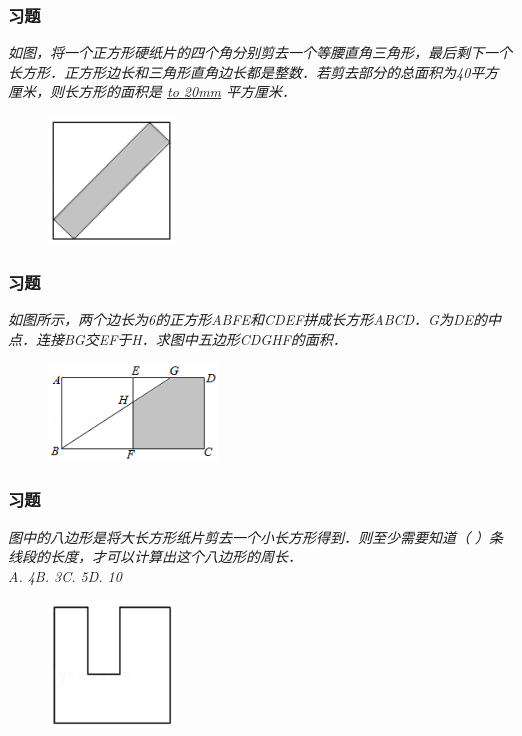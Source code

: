 \begin{frame}
    \frametitle{习题\theframecounter}
    \textit{如图，将一个正方形硬纸片的四个角分别剪去一个等腰直角三角形，最后剩下一个长方形．正方形边长和三角形直角边长都是整数．若剪去部分的总面积为40平方厘米，则长方形的面积是 \underline{\hbox to 20mm{}} 平方厘米．} 
    \begin{figure}[H] 
        \centering
        \includegraphics[width=0.3\textwidth]{./pics/Chapter_3/12.png}
    \end{figure}
\end{frame}

\begin{frame}
    \frametitle{习题\theframecounter}
    \vspace*{-1cm}
    \textit{如图所示，两个边长为6的正方形ABFE和CDEF拼成长方形ABCD．G为DE的中点．连接BG交EF于H．求图中五边形CDGHF的面积．} 
    \begin{figure}[H] 
        \centering
        \includegraphics[width=0.4\textwidth]{./pics/Chapter_3/13.png}
    \end{figure}
\end{frame}

\begin{frame}
    \frametitle{习题\theframecounter}
    \textit{图中的八边形是将大长方形纸片剪去一个小长方形得到．则至少需要知道（ ）条线段的长度，才可以计算出这个八边形的周长．} \\
    \textit{A. 4\quad B. 3\quad C. 5\quad D. 10}
    \begin{figure}[H] 
        \centering
        \includegraphics[width=0.3\textwidth]{./pics/Chapter_3/14.png}
    \end{figure}
\end{frame}

